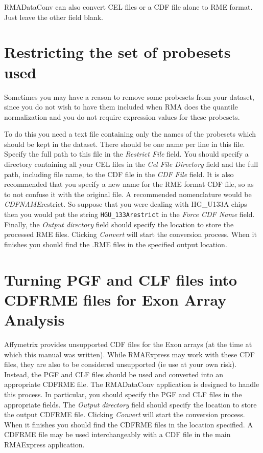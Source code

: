\documentclass[11pt]{report}
\begin{document}
RMADataConv can also convert CEL files or a CDF file alone to RME format. Just leave the other field blank.

\section{Restricting the set of probesets used}

Sometimes you may have a reason to remove some probesets from your dataset, since you do not wish to have them included when RMA does the quantile normalization and you do not require expression values for these probesets. 

To do this you need a text file containing only the names of the probesets which should be kept in the dataset. There should be one name per line in this file. Specify the full path to this file in the {\it Restrict File} field. You should  specify a directory containing all your CEL files in the {\it Cel File Directory} field and the full path, including file name, to the CDF file in the {\it CDF File} field. It is also recommended that you specify a new name for the RME format CDF file, so as to not confuse it with the original file. A recommended nomenclature would be {\it CDFNAME}restrict. So suppose that you were dealing with HG\_U133A chips then you would put the string {\tt HGU\_133Arestrict} in the  {\it Force CDF Name} field. Finally, the {\it Output directory} field should specify the location to store the processed RME files.  Clicking {\it Convert} will start the conversion process. When it finishes you should find the .RME files in the specified output location. 

\section{Turning PGF and CLF files into CDFRME files for Exon Array Analysis}

Affymetrix provides unsupported CDF files for the Exon arrays (at the time at which this manual was written). While RMAExpress may work with these CDF files, they are also to be considered unsupported (ie use at your own risk). Instead, the PGF and CLF files should be used and converted into an appropriate CDFRME file. The RMADataConv application is designed to handle this process. In particular, you should specify the PGF and CLF files in the appropriate fields. The {\it Output directory} field should specify the location to store the output CDFRME file. Clicking {\it Convert} will start the conversion process. When it finishes you should find the CDFRME files in the location specified. A CDFRME file may be used interchangeably with a CDF file in the main RMAExpress application.
\end{document}
